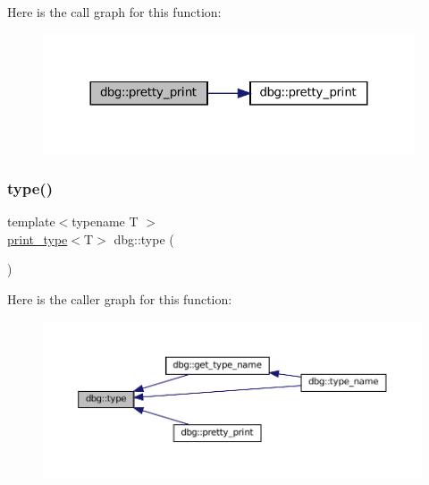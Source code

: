 Here is the call graph for this function\+:
\nopagebreak
\begin{figure}[H]
\begin{center}
\leavevmode
\includegraphics[width=312pt]{namespacedbg_adf02078069da78815c208dd638a01640_cgraph}
\end{center}
\end{figure}
\mbox{\label{namespacedbg_a2365d80e3a3525e6025040383ff8661b}} 
\subsubsection{\texorpdfstring{type()}{type()}}
{\footnotesize\ttfamily template$<$typename T $>$ \\
\hyperlink{structdbg_1_1print__type}{print\+\_\+type}$<$T$>$ dbg\+::type (\begin{DoxyParamCaption}{ }\end{DoxyParamCaption})}

Here is the caller graph for this function\+:
\nopagebreak
\begin{figure}[H]
\begin{center}
\leavevmode
\includegraphics[width=350pt]{namespacedbg_a2365d80e3a3525e6025040383ff8661b_icgraph}
\end{center}
\end{figure}
\mbox{\label{namespacedbg_aef0097e53230ee373eaabc4981048cac}} 
